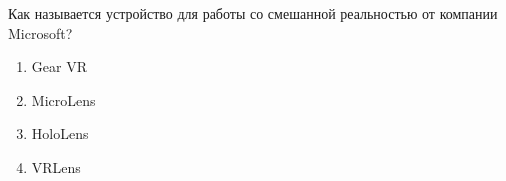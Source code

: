 
Как называется устройство для работы со смешанной реальностью от компании Microsoft?

\begin{enumerate}
    \item Gear VR
    \item MicroLens
    \item HoloLens
    \item VRLens
\end{enumerate}


